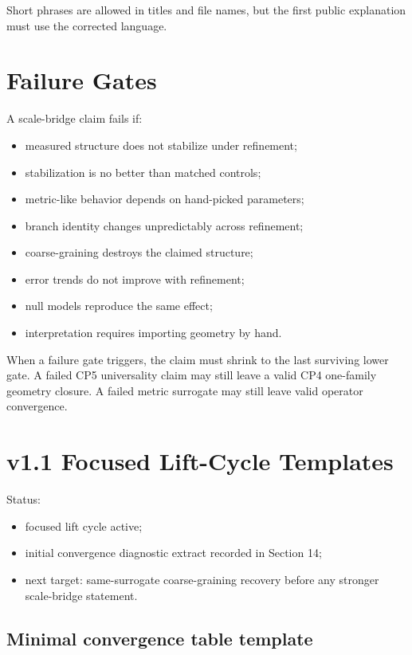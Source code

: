 \documentclass[11pt]{article}
\begin{document}
Short phrases are allowed in titles and file names, but the first public explanation must use the corrected language.

\section{Failure Gates}

A scale-bridge claim fails if:
\begin{itemize}
\item measured structure does not stabilize under refinement;
\item stabilization is no better than matched controls;
\item metric-like behavior depends on hand-picked parameters;
\item branch identity changes unpredictably across refinement;
\item coarse-graining destroys the claimed structure;
\item error trends do not improve with refinement;
\item null models reproduce the same effect;
\item interpretation requires importing geometry by hand.
\end{itemize}

When a failure gate triggers, the claim must shrink to the last surviving lower gate. A failed CP5 universality claim may still leave a valid CP4 one-family geometry closure. A failed metric surrogate may still leave valid operator convergence.

\section{v1.1 Focused Lift-Cycle Templates}

Status:
\begin{itemize}
\item focused lift cycle active;
\item initial convergence diagnostic extract recorded in Section 14;
\item next target: same-surrogate coarse-graining recovery before any stronger scale-bridge statement.
\end{itemize}

\subsection{Minimal convergence table template}
\end{document}
